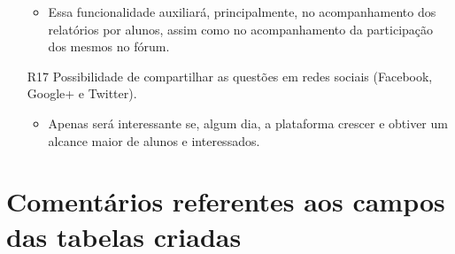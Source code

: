 \documentclass[graduacao,brazil]{ThesisPUC}
\begin{document}
\begin{itemize}
  \begin{itemize}
    \item Essa funcionalidade auxiliar\'{a}, principalmente, no acompanhamento dos relat\'{o}rios
	  por alunos, assim como no acompanhamento da participa\c{c}\~{a}o dos mesmos no f\'{o}rum.
  \end{itemize}
  \item [R17] Possibilidade de compartilhar as quest\~{o}es em redes sociais (Facebook, Google+ e Twitter).
  \begin{itemize}
    \item Apenas ser\'{a} interessante se, algum dia, a plataforma crescer e obtiver um alcance maior
	  de alunos e interessados.
  \end{itemize}
\end{itemize}


\arial


\normalfont


\appendix

\chapter{Coment\'{a}rios referentes aos campos das tabelas criadas}

\end{document}
